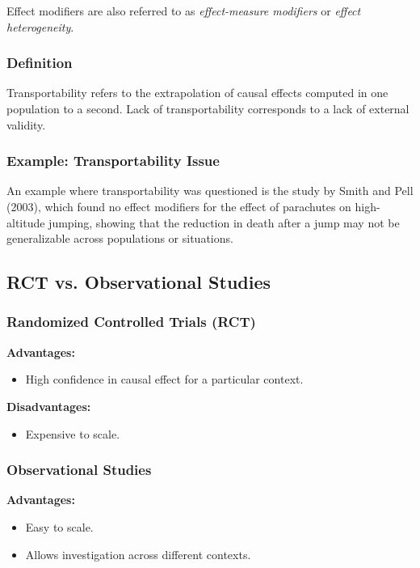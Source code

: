 Effect modifiers are also referred to as \emph{effect-measure modifiers} or \emph{effect heterogeneity}.

\subsubsection{Definition}

Transportability refers to the extrapolation of causal effects computed in one population to a second. Lack of transportability corresponds to a lack of external validity.

\subsubsection{Example: Transportability Issue}

An example where transportability was questioned is the study by Smith and Pell (2003), which found no effect modifiers for the effect of parachutes on high-altitude jumping, showing that the reduction in death after a jump may not be generalizable across populations or situations.

\subsection{RCT vs. Observational Studies}

\subsubsection{Randomized Controlled Trials (RCT)}

\textbf{Advantages:}
\begin{itemize}
    \item High confidence in causal effect for a particular context.
\end{itemize}

\textbf{Disadvantages:}
\begin{itemize}
    \item Expensive to scale.
\end{itemize}

\subsubsection{Observational Studies}

\textbf{Advantages:}
\begin{itemize}
    \item Easy to scale.
    \item Allows investigation across different contexts.
\end{itemize}

